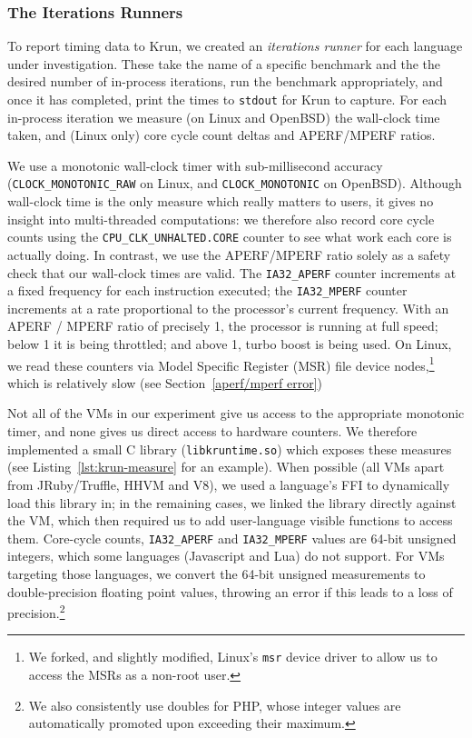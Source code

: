 \documentclass[preprint,numbers,10pt]{sigplanconf}
\newcommand{\krun}{Krun\xspace}
\begin{document}
\subsubsection{The Iterations Runners}

To report timing data to \krun, we created an
\emph{iterations runner} for each language under investigation.
These take the name of a specific benchmark and the
the desired number of in-process iterations, run the benchmark appropriately,
and once it has completed, print the times to \texttt{stdout} for \krun to
capture. For each in-process iteration we
measure (on Linux and OpenBSD) the wall-clock time taken, and (Linux only) core
cycle count deltas and APERF/MPERF ratios.

We use a monotonic wall-clock timer with sub-millisecond accuracy
(\texttt{CLOCK\_MONOTONIC\_RAW} on Linux, and \texttt{CLOCK\-\_MONOTONIC} on
OpenBSD). Although wall-clock time is the only measure which really matters to
users, it gives no insight into multi-threaded computations: we therefore also record
core cycle counts using the \texttt{CPU\-\_CLK\-\_UNHALTED\-.CORE} counter to see
what work each core is actually doing. In contrast, we use the APERF/MPERF
ratio solely as a safety check that our wall-clock times are valid.
The \texttt{IA32\_APERF} counter increments at a fixed
frequency for each instruction executed; the \texttt{IA32\_MPERF} counter increments at a rate
proportional to the processor's current frequency. With an APERF / MPERF ratio of
precisely 1, the processor is running at full speed; below 1 it is being
throttled; and above 1, turbo boost is being used. On
Linux, we read these counters via Model Specific Register (MSR) file device
nodes,\footnote{We forked, and slightly modified, Linux's \texttt{msr} device
driver to allow us to access the MSRs as a non-root user.}
which is relatively slow (see Section~\ref{aperf/mperf error})

Not all of the VMs in our experiment give us access to the appropriate monotonic
timer, and none gives us direct access to hardware counters. We therefore
implemented a small C library (\texttt{libkruntime.so}) which exposes these
measures (see Listing~\ref{lst:krun-measure} for an example). When possible
(all VMs apart from JRuby/Truffle, HHVM and V8), we used a language's FFI to dynamically load this library
in; in the remaining cases, we linked the library directly against the VM, which
then required us to add user-language visible functions to access them.
Core-cycle counts, \texttt{IA32\_APERF} and \texttt{IA32\_MPERF}
values are 64-bit unsigned integers, which some languages
(Javascript and Lua) do not support. For VMs targeting those languages, we
convert the 64-bit unsigned measurements to
double-precision floating point values, throwing an error if this leads to a
loss of precision.\footnote{We also consistently use doubles for PHP, whose
integer values are automatically promoted upon exceeding their maximum.}
\end{document}

